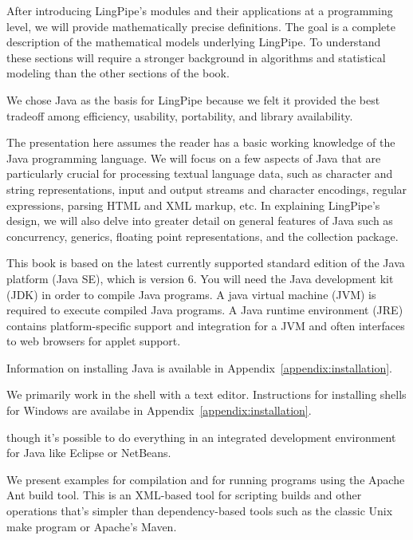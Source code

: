 After introducing LingPipe's modules and their applications at a
programming level, we will provide mathematically precise definitions.
The goal is a complete description of the mathematical models
underlying LingPipe.  To understand these sections will require a
stronger background in algorithms and statistical modeling than
the other sections of the book.
        



\noindent
We chose Java as the basis for LingPipe because we felt it provided
the best tradeoff among efficiency, usability, portability, and
library availability.

The presentation here assumes the reader has a basic working knowledge
of the Java programming language.  We will focus on a few aspects of
Java that are particularly crucial for processing textual language
data, such as character and string representations, input and output
streams and character encodings, regular expressions, parsing HTML and
XML markup, etc.  In explaining LingPipe's design, we will also delve
into greater detail on general features of Java such as concurrency,
generics, floating point representations, and the collection package.


\noindent
This book is based on the latest currently supported standard edition
of the Java platform (Java SE), which is version 6.  You will need the
Java development kit (JDK) in order to compile Java programs.  A java
virtual machine (JVM) is required to execute compiled Java programs.
A Java runtime environment (JRE) contains platform-specific support
and integration for a JVM and often interfaces to web browsers for
applet support.

Information on installing Java is available in Appendix~\ref{appendix:installation}.



\noindent
We primarily work in the shell with a text editor. Instructions for
installing shells for Windows are availabe in Appendix~\ref{appendix:installation}.

though it's
possible to do everything in an integrated development environment for
Java like Eclipse or NetBeans.

We present examples for compilation and for running programs using the
Apache Ant build tool.  This is an XML-based tool for scripting builds
and other operations that's simpler than dependency-based tools such
as the classic Unix make program or Apache's Maven.  



